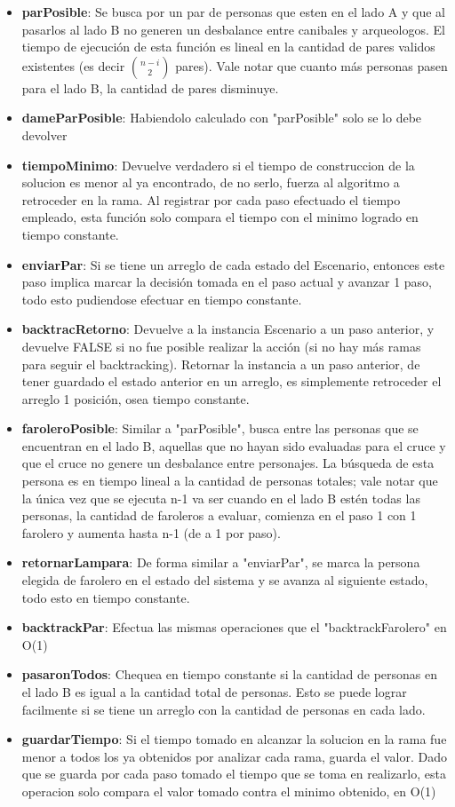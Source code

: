 \begin{itemize}
\item {\bf parPosible}: Se busca por un par de personas que esten en el lado A y que al pasarlos al lado B no generen un desbalance entre canibales y arqueologos. El tiempo de ejecución de esta función es lineal en la cantidad de pares validos existentes (es decir $\binom {n-i}{2}$ pares). Vale notar que cuanto más personas pasen para el lado B, la cantidad de pares disminuye.
\item {\bf dameParPosible}: Habiendolo calculado con "parPosible" solo se lo debe devolver
\item {\bf tiempoMinimo}: Devuelve verdadero si el tiempo de construccion de la solucion es menor al ya encontrado, de no serlo, fuerza al algoritmo a retroceder en la rama. Al registrar por cada paso efectuado el tiempo empleado, esta función solo compara el tiempo con el minimo logrado en tiempo constante.
\item {\bf enviarPar}: Si se tiene un arreglo de cada estado del Escenario, entonces este paso implica marcar la decisión tomada en el paso actual y avanzar 1 paso, todo esto pudiendose efectuar en tiempo constante.
\item {\bf backtracRetorno}: Devuelve a la instancia Escenario a un paso anterior, y devuelve FALSE si no fue posible realizar la acción (si no hay más ramas para seguir el backtracking). Retornar la instancia a un paso anterior, de tener guardado el estado anterior en un arreglo, es simplemente retroceder el arreglo 1 posición, osea tiempo constante.
\item {\bf faroleroPosible}: Similar a "parPosible", busca entre las personas que se encuentran en el lado B, aquellas que no hayan sido evaluadas para el cruce y que el cruce no genere un desbalance entre personajes. La búsqueda de esta persona es en tiempo lineal a la  cantidad de personas totales; vale notar que la única vez que se ejecuta n-1 va ser cuando en el lado B estén todas las personas, la cantidad de faroleros a evaluar, comienza en el paso 1 con 1 farolero y aumenta hasta n-1 (de a 1 por paso).
\item {\bf retornarLampara}: De forma similar a "enviarPar", se marca la persona elegida de farolero en el estado del sistema y se avanza al siguiente estado, todo esto en tiempo constante.
\item {\bf backtrackPar}: Efectua las mismas operaciones que el "backtrackFarolero" en O(1)
\item {\bf pasaronTodos}: Chequea en tiempo constante si la cantidad de personas en el lado B es igual a la cantidad total de personas. Esto se puede lograr facilmente si se tiene un arreglo con la cantidad de personas en cada lado.
\item {\bf guardarTiempo}: Si el tiempo tomado en alcanzar la solucion en la rama fue menor a todos los ya obtenidos por analizar cada rama, guarda el valor. Dado que se guarda por cada paso tomado el tiempo que se toma en realizarlo, esta operacion solo compara el valor tomado contra el minimo obtenido, en O(1)
\end{itemize}  

